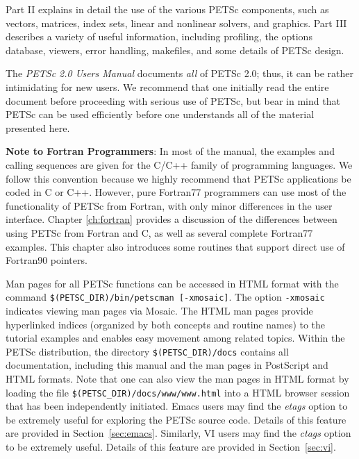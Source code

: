 Part II explains in detail the use of the various PETSc components,
such as vectors, matrices, index sets, linear and nonlinear
solvers, and graphics.  Part III describes a variety of useful
information, including profiling, the options database, viewers, error
handling, makefiles, and some details of
PETSc design.  

The {\em PETSc 2.0 Users Manual} documents {\em all} of PETSc 2.0; thus,
it can be rather intimidating for new users. We recommend that one initially
read the entire document before proceeding with serious use of PETSc,
but bear in mind that PETSc can be used efficiently
before one understands all of the material presented here. 

\medskip \medskip

{\bf Note to Fortran Programmers}: In most of the  
manual, the examples and calling sequences are given for the C/C++
family of programming languages.  We follow this convention because we
highly recommend that PETSc applications be coded in C or C++.
However, pure Fortran77 programmers can use most of the
functionality of PETSc from Fortran, with only minor differences in
the user interface.  Chapter \ref{ch:fortran} provides a discussion of the
differences between using PETSc from Fortran and C, as well as several
complete Fortran77 examples.  This chapter also introduces some
routines that support direct use of Fortran90 pointers.

\medskip \medskip

Man pages for all PETSc functions can be
accessed in HTML format with the command {\tt \$(PETSC\_DIR)\-/bin\-/petscman
[-xmosaic]}.  The option {\tt -xmosaic} indicates viewing man pages
via Mosaic.  The HTML man pages
provide hyperlinked indices (organized by
both concepts and routine names) to the tutorial examples and enables
easy movement among related topics.  Within the PETSc distribution, the directory
{\tt \$(PETSC\_DIR)/docs} contains all documentation, including this
manual and the man pages in PostScript and HTML
formats. Note that one can also view the man pages in HTML format
by loading the file {\tt \$(PETSC\_DIR)/docs/www/www.html}
into a HTML browser session that has been independently initiated.
Emacs users may find the
{\em etags} option to be extremely useful for exploring the PETSc
source code.  Details of this feature are provided in
Section~\ref{sec:emacs}. Similarly, VI users may find the
{\em ctags} option to be extremely useful. Details of this 
feature are provided in Section~\ref{sec:vi}.

